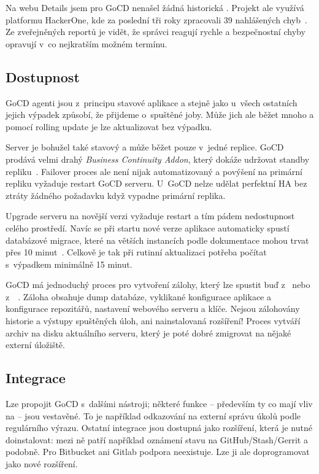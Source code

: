        Na webu  Details jsem pro GoCD nenašel žádná historická . Projekt ale využívá platformu HackerOne, kde za poslední tři roky zpracovali 39 nahlášených chyb~\cite{gocd-hackerone}. Ze zveřejněných reportů je vidět, že správci reagují rychle a bezpečnostní chyby opravují v~co nejkratším možném termínu.

    \subsection{Dostupnost}
        GoCD agenti jsou z~principu stavové aplikace a stejně jako u~všech ostatních \CI jejich výpadek způsobí, že přijdeme o~spuštěné joby. Může jich ale běžet mnoho a pomocí rolling update je lze aktualizovat bez výpadku.

        Server je bohužel také stavový a může běžet pouze v~jedné replice. GoCD prodává velmi drahý \textit{Business Continuity Addon}, který dokáže udržovat standby repliku~\cite{gocd-ha}. Failover proces ale není nijak automatizovaný a povýšení na primární repliku vyžaduje restart GoCD serveru. U~GoCD nelze udělat perfektní HA bez ztráty žádného požadavku když vypadne primární replika.

        Upgrade serveru na novější verzi vyžaduje restart a tím pádem nedostupnost celého prostředí. Navíc se při startu nové verze aplikace automaticky spustí databázové migrace, které na větších instancích podle dokumentace mohou trvat přes 10 minut~\cite{gocd-upgrading}. Celkově je tak při rutinní aktualizaci potřeba počítat s~výpadkem minimálně 15 minut.

        GoCD má jednoduchý proces pro vytvoření zálohy, který lze spustit buď z~ nebo z~~\cite{gocd-backup}. Záloha obsahuje dump databáze, vyklikané  konfigurace aplikace a konfigurace repozitářů, nastavení webového serveru a klíče. Nejsou zálohovány historie a výstupy spuštěných úloh, ani nainstalovaná rozšíření! Proces vytváří archiv na disku aktuálního serveru, který je poté dobré zmigrovat na nějaké externí úložiště.

    \subsection{Integrace}
        Lze propojit GoCD s~dalšími nástroji; některé funkce -- především ty co mají vliv na  -- jsou vestavěné. To je například odkazování na externí správu úkolů podle regulárního výrazu. Ostatní integrace jsou dostupná jako rozšíření, která je nutné doinstalovat: mezi ně patří například oznámení stavu na GitHub/Stash/Gerrit a podobně. Pro Bitbucket ani Gitlab podpora neexistuje. Lze ji ale doprogramovat jako nové rozšíření.

